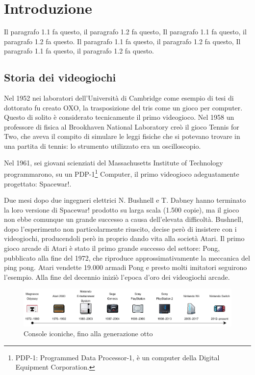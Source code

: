 %
%

\chapter{Introduzione}
\label{cap:Introduzione}

Il paragrafo 1.1 fa questo, il paragrafo 1.2 fa questo, Il paragrafo 1.1 fa questo, il paragrafo 1.2 fa questo. Il paragrafo 1.1 fa questo, il paragrafo 1.2 fa questo, Il paragrafo 1.1 fa questo, il paragrafo 1.2 fa questo.

\section{Storia dei videogiochi}

Nel 1952 nei laboratori dell'Università di Cambridge come esempio di tesi di dottorato fu creato OXO, la trasposizione del tris come un gioco per computer. Questo di solito è considerato tecnicamente il primo videogioco. Nel 1958 un professore di fisica al Brookhaven National Laboratory creò il gioco Tennis for Two, che aveva il compito di simulare le leggi fisiche che si potevano trovare in una partita di tennis: lo strumento utilizzato era un oscilloscopio.

Nel 1961, sei giovani scienziati del Massachusetts Institute of Technology programmarono, su un PDP-1\footnote{PDP-1: Programmed Data Processor-1, è un computer della Digital Equipment Corporation.} Computer, il primo videogioco adeguatamente progettato: Spacewar!.

Due mesi dopo due ingegneri elettrici N. Bushnell e T. Dabney hanno terminato la loro versione di Spacewar! prodotto su larga scala (1.500 copie), ma il gioco non ebbe comunque un grande successo a causa dell'elevata difficoltà. Bushnell, dopo l'esperimento non particolarmente riuscito, decise però di insistere con i videogiochi, producendoli però in proprio dando vita alla società Atari. Il primo gioco arcade di Atari è stato il primo grande successo del settore: Pong, pubblicato alla fine del 1972, che riproduce approssimativamente la meccanica del ping pong. Atari vendette 19.000 armadi Pong e presto molti imitatori seguirono l'esempio. Alla fine del decennio iniziò l'epoca d'oro dei videogiochi arcade.

\begin{figure}[H]
	\includegraphics[width=\linewidth]{immagini/consoles_history}
	\caption{Console iconiche, fino alla generazione otto}
	\label{fig:consoles_history}
\end{figure}


